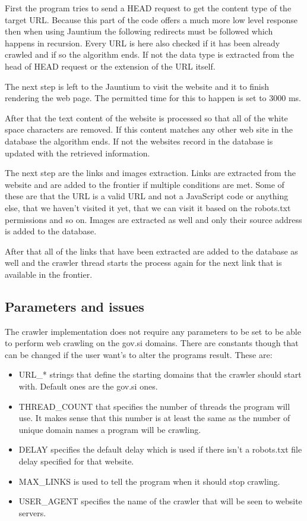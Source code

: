 \documentclass[9pt]{IEEEtran}
\begin{document}
First the program tries to send a HEAD request to get the content type of the target URL.
Because this part of the code offers a much more low level response then when using Jauntium the following redirects must be followed which happens in recursion.
Every URL is here also checked if it has been already crawled and if so the algorithm ends.
If not the data type is extracted from the head of HEAD request or the extension of the URL itself.

The next step is left to the Jauntium to visit the website and it to finish rendering the web page.
The permitted time for this to happen is set to 3000 ms. 

After that the text content of the website is processed so that all of the white space characters are removed. 
If this content matches any other web site in the database the algorithm ends.
If not the websites record in the database is updated with the retrieved information.

The next step are the links and images extraction.
Links are extracted from the website and are added to the frontier if multiple conditions are met.
Some of these are that the URL is a valid URL and not a JavaScript code or anything else, that we haven't visited it yet, that we can visit it based on the robots.txt permissions and so on.
Images are extracted as well and only their source address is added to the database.

After that all of the links that have been extracted are added to the database as well and the crawler thread starts the process again for the next link that is available in the frontier.

\subsection{Parameters and issues}

The crawler implementation does not require any parameters to be set to be able to perform web crawling on the gov.si domains.
There are constants though that can be changed if the user want's to alter the programs result.
These are:
\begin{itemize}
\item{URL\_* strings that define the starting domains that the crawler should start with. Default ones are the gov.si ones.}
\item{THREAD\_COUNT that specifies the number of threads the program will use. It makes sense that this number is at least the same as the number of unique domain names a program will be crawling.}
\item{DELAY specifies the default delay which is used if there isn't a robots.txt file delay specified for that website.}
\item{MAX\_LINKS is used to tell the program when it should stop crawling.}
\item{USER\_AGENT specifies the name of the crawler that will be seen to website servers.}
\end{itemize}
\end{document}
